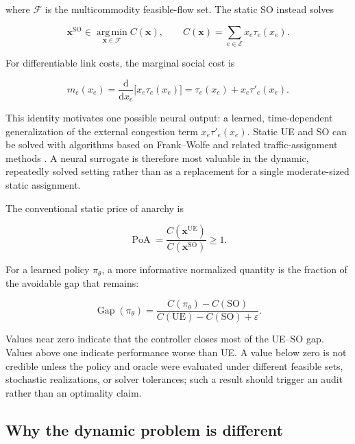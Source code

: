 \documentclass[11pt]{article}
\newcommand{\E}{\mathcal{E}}
\newcommand{\argmin}{\operatorname*{arg\,min}}
\newcommand{\poa}{\operatorname{PoA}}
\newcommand{\gap}{\operatorname{Gap}}
\newcommand{\vect}[1]{\bm{#1}}
\begin{document}
where \(\mathcal{F}\) is the multicommodity feasible-flow set.  The static SO instead
solves

\begin{equation}
  \vect{x}^{\mathrm{SO}}
  \in
  \argmin_{\vect{x}\in\mathcal{F}}
  C(\vect{x}),
  \qquad
  C(\vect{x}) = \sum_{e\in\E} x_e\tau_e(x_e).
  \label{eq:so}
\end{equation}

For differentiable link costs, the marginal social cost is

\begin{equation}
  m_e(x_e)
  = \frac{\mathrm{d}}{\mathrm{d}x_e}
    \big[x_e\tau_e(x_e)\big]
  = \tau_e(x_e)+x_e\tau'_e(x_e).
  \label{eq:marginal-cost}
\end{equation}

This identity motivates one possible neural output: a learned, time-dependent
generalization of the external congestion term \(x_e\tau'_e(x_e)\).  Static UE and SO
can be solved with algorithms based on Frank--Wolfe and related traffic-assignment
methods \citep{frank1956,patriksson1994}.  A neural surrogate is therefore most
valuable in the dynamic, repeatedly solved setting rather than as a replacement for a
single moderate-sized static assignment.

The conventional static price of anarchy is

\begin{equation}
  \poa = \frac{C(\vect{x}^{\mathrm{UE}})}
                   {C(\vect{x}^{\mathrm{SO}})} \geq 1.
  \label{eq:poa}
\end{equation}

For a learned policy \(\pi_\theta\), a more informative normalized quantity is the
fraction of the avoidable gap that remains:

\begin{equation}
  \gap(\pi_\theta)
  = \frac{C(\pi_\theta)-C(\mathrm{SO})}
         {C(\mathrm{UE})-C(\mathrm{SO})+\varepsilon}.
  \label{eq:gap}
\end{equation}

Values near zero indicate that the controller closes most of the UE--SO gap.  Values
above one indicate performance worse than UE.  A value below zero is not credible
unless the policy and oracle were evaluated under different feasible sets, stochastic
realizations, or solver tolerances; such a result should trigger an audit rather than
an optimality claim.

\subsection{Why the dynamic problem is different}
\end{document}
